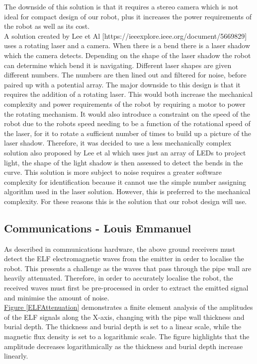 \documentclass[11pt]{article}		%
\newcommand{\figref}[1]{\hyperref[#1]{Figure \ref*{#1}}}    %
\begin{document}
        The downside of this solution is that it requires a stereo camera which is not ideal for compact design of our robot, plus it increases the power requirements of the robot as well as its cost.
        \\
        A solution created by Lee et Al [https://ieeexplore.ieee.org/document/5669829] uses a rotating laser and a camera. 
        When there is a bend there is a laser shadow which the camera detects. 
        Depending on the shape of the laser shadow the robot can determine which bend it is navigating. 
       	Different laser shapes are given different numbers. 
       	The numbers are then lined out and filtered for noise, before paired up with a potential array. 
       	The major downside to this design is that it requires the addition of a rotating laser. 
       	This would both increase the mechanical complexity and power requirements of the robot by requiring a motor to power the rotating mechanism. 
       	It would also introduce a constraint on the speed of the robot due to the robots speed needing to be a function of the rotational speed of the laser, for it to rotate a sufficient number of times to build up a picture of the laser shadow. 
       	Therefore, it was decided to use a less mechanically complex solution also proposed by Lee et al which uses just an array of LEDs to project light, the shape of the light shadow is then assessed to detect the bends in the curve. 
       	This solution is more subject to noise requires a greater software complexity for identification because it cannot use the simple number assigning algorithm used in the laser solution. 
       	However, this is preferred to the mechanical complexity. 
       	For these reasons this is the solution that our robot design will use.

		\subsection[Communications]{Communications - Louis Emmanuel}
		
		As described in communications hardware, the above ground receivers must detect the ELF electromagnetic waves from the emitter in order to localise the robot.
		This presents a challenge as the waves that pass through the pipe wall are heavily attenuated. 
		Therefore, in order to accurately localise the robot, the received waves must first be pre-processed in order to extract the emitted signal and minimise the amount of noise.
		\\
	    \hspace*{3ex}\figref{ELFAttenuation}  demonstrates a finite element analysis of the amplitudes of the ELF signals along the X-axis, changing with the pipe wall thickness and burial depth.
	    The thickness and burial depth is set to a linear scale, while the magnetic flux density is set to a logarithmic scale.
	    The figure highlights that the amplitude decreases logarithmically as the thickness and burial depth increase linearly.
	    
\end{document}
